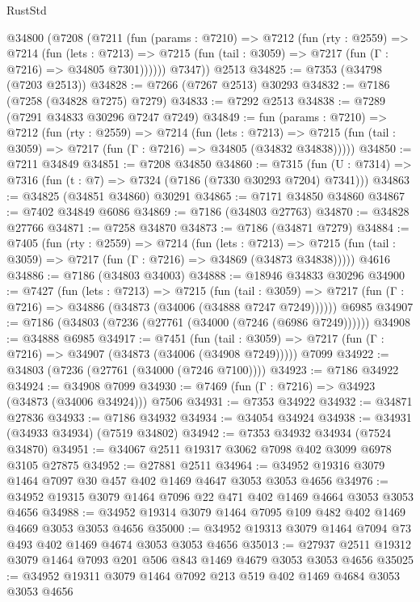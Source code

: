 \begin{lexlean}{RustStd}
\begin{coremodule}
{\begin{coremodule}
{{{{{{{{{{{{{{{{{{{{{{{{{{{{{{{{    @34800
      (@7208
        (@7211
          (fun (params : @7210) =>
          @7212
            (fun (rty : @2559) =>
            @7214
              (fun (lets : @7213) =>
              @7215 (fun (tail : @3059) => @7217 (fun (Γ : @7216) => @34805 @7301))))))
        @7347))
    @2513
@34825 := @7353 (@34798 (@7203 @2513))
@34828 := @7266 (@7267 @2513) @30293
@34832 := @7186 (@7258 (@34828 @7275) @7279)
@34833 := @7292 @2513
@34838 := @7289 (@7291 @34833 @30296 @7247 @7249)
@34849 := fun (params : @7210) =>
  @7212
    (fun (rty : @2559) =>
    @7214
      (fun (lets : @7213) =>
      @7215 (fun (tail : @3059) => @7217 (fun (Γ : @7216) => @34805 (@34832 @34838)))))
@34850 := @7211 @34849
@34851 := @7208 @34850
@34860 := @7315
    (fun (U : @7314) => @7316 (fun (t : @7) => @7324 (@7186 (@7330 @30293 @7204) @7341)))
@34863 := @34825 (@34851 @34860) @30291
@34865 := @7171 @34850 @34860
@34867 := @7402 @34849 @6086
@34869 := @7186 (@34803 @27763)
@34870 := @34828 @27766
@34871 := @7258 @34870
@34873 := @7186 (@34871 @7279)
@34884 := @7405
    (fun (rty : @2559) =>
    @7214
      (fun (lets : @7213) =>
      @7215 (fun (tail : @3059) => @7217 (fun (Γ : @7216) => @34869 (@34873 @34838)))))
    @4616
@34886 := @7186 (@34803 @34003)
@34888 := @18946 @34833 @30296
@34900 := @7427
    (fun (lets : @7213) =>
    @7215
      (fun (tail : @3059) =>
      @7217 (fun (Γ : @7216) => @34886 (@34873 (@34006 (@34888 @7247 @7249))))))
    @6985
@34907 := @7186 (@34803 (@7236 (@27761 (@34000 (@7246 (@6986 @7249))))))
@34908 := @34888 @6985
@34917 := @7451
    (fun (tail : @3059) => @7217 (fun (Γ : @7216) => @34907 (@34873 (@34006 (@34908 @7249)))))
    @7099
@34922 := @34803 (@7236 (@27761 (@34000 (@7246 @7100))))
@34923 := @7186 @34922
@34924 := @34908 @7099
@34930 := @7469 (fun (Γ : @7216) => @34923 (@34873 (@34006 @34924))) @7506
@34931 := @7353 @34922
@34932 := @34871 @27836
@34933 := @7186 @34932
@34934 := @34054 @34924
@34938 := @34931 (@34933 @34934) (@7519 @34802)
@34942 := @7353 @34932 @34934 (@7524 @34870)
@34951 := @34067 @2511 @19317 @3062 @7098 @402 @3099 @6978 @3105 @27875
@34952 := @27881 @2511
@34964 := @34952 @19316 @3079 @1464 @7097 @30 @457 @402 @1469 @4647 @3053 @3053 @4656
@34976 := @34952 @19315 @3079 @1464 @7096 @22 @471 @402 @1469 @4664 @3053 @3053 @4656
@34988 := @34952 @19314 @3079 @1464 @7095 @109 @482 @402 @1469 @4669 @3053 @3053 @4656
@35000 := @34952 @19313 @3079 @1464 @7094 @73 @493 @402 @1469 @4674 @3053 @3053 @4656
@35013 := @27937 @2511 @19312 @3079 @1464 @7093 @201 @506 @843 @1469 @4679 @3053 @3053 @4656
@35025 := @34952 @19311 @3079 @1464 @7092 @213 @519 @402 @1469 @4684 @3053 @3053 @4656
}}}}}}}}}}}}}}}}}}}}}}}}}}}}}}}}
\end{coremodule}}
\end{coremodule}
\end{lexlean}
